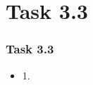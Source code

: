 \section{Task 3.3}
\begin{frame}
\frametitle{Task 3.3}
\begin{itemize}
\item 1. 
\end{itemize}
\end{frame}